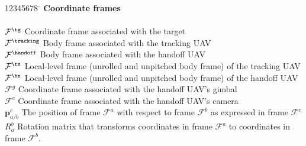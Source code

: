 %
%
%
%

\begin{tabbing}
12345678 \= \kill
\textbf{Coordinate frames}\\
\\[5pt]
$\mathcal{F}^{\tg}$ 		\> Coordinate frame associated with the target  \\
$\mathcal{F}^{\tracking}$ 	\> Body frame associated with the tracking UAV  \\
$\mathcal{F}^{\handoff}$ 	\> Body frame associated with the handoff UAV   \\
$\mathcal{F}^{\tn}$ 		\> Local-level frame (unrolled and unpitched body frame) of the tracking UAV \\
$\mathcal{F}^{\hn}$ 		\> Local-level frame (unrolled and unpitched body frame) of the handoff UAV \\
$\mathcal{F}^{g}$ 			\> Coordinate frame associated with the handoff UAV's gimbal  \\
$\mathcal{F}^{c}$ 			\> Coordinate frame associated with the handoff UAV's camera \\

$\mathbf{p}_{a/b}^c$ \> The position of frame $\mathcal{F}^a$ with respect to frame $\mathcal{F}^b$ as expressed in frame $\mathcal{F}^c$ \\
$R_a^b$ \> Rotation matrix that transforms coordinates in frame $\mathcal{F}^a$ to coordinates in frame $\mathcal{F}^b$.


\end{tabbing}
